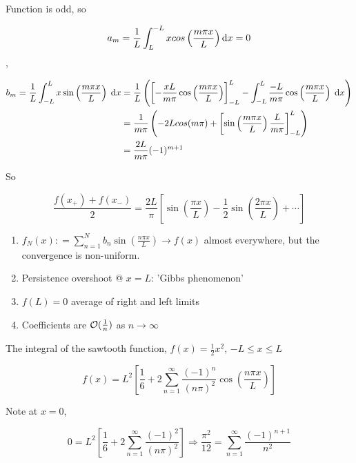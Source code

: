 \documentclass[a4paper]{article}
\begin{document}
Function is odd, so

\[ a_{m} = \frac{1}{L} \int_{L}^{-L} x cos\left( \frac{m \pi x}{L} \right) \\ \mathrm{d} x = 0 \],

\begin{align*}
b_{m} = \frac{1}{L} \int_{-L}^{L} x \sin \left( \frac{m \pi x}{L}\right) \; \mathrm{d} x & = \frac{1}{L} \left(  \left[  - \frac{xL}{m\pi} \cos\left( \frac{m \pi x}{L} \right)  \right]_{-L}^{L} - \int_{-L}^{L} \frac{-L}{m \pi} \cos\left( \frac{m \pi x}{L} \right) \; \mathrm{d} x  \right)   \\
& = \frac{1}{m\pi} \left( -2L cos(m \pi) + \left[  \sin \left( \frac{m \pi x}{L} \right) \frac{L}{m \pi}  \right]_{-L}^{L}  \right) \\
& = \frac{2L}{m\pi} (-1)^{m+1}
\end{align*}

So

\[ \frac{f(x_{+}) + f(x_{-})}{2} = \frac{2L}{\pi} \left[  \sin \left( \frac{\pi x}{L} \right) - \frac{1}{2} \sin  \left( \frac{2 \pi x}{L} \right) + \cdots  \right]  \]

\begin{enumerate}
	\item $ f_{N} (x) : = \sum_{n=1}^{N} b_{n} \sin\left( \frac{n \pi x}{L} \right) \to f(x)  $ almost everywhere, but the convergence is non-uniform. 
	\item Persistence overshoot @ $ x = L $: 'Gibbs phenomenon'
	\item $ f(L) = 0 $ average of right and left limits
	\item Coefficients are $ \mathcal{O} (\frac{1}{n}) $ as $ n \to \infty $
	
\end{enumerate}

\begin{eg}
	The integral of the sawtooth function, $ f(x) = \frac{1}{2} x^{2} $, $ - L \leq x \leq L $
\end{eg}
	
\begin{ex}
	\[ f(x) = L^{2}  \left[  \frac{1}{6} + 2 \sum_{n=1}^{\infty} \frac{(-1)^{n}}{(n \pi)^{2}} \cos \left( \frac{n \pi x}{L} \right)  \right]  \]
\end{ex}

Note at $ x = 0 $, 

\[ 0 = L^{2} \left[ \frac{1}{6}  + 2 \sum_{n=1}^{\infty} \frac{(-1)^{2}}{(n \pi)^{2}} \right] \Rightarrow \frac{\pi^{2}}{12} = \sum_{n=1}^{\infty} \frac{(-1)^{n+1}}{n^{2}} \]
\end{document}
